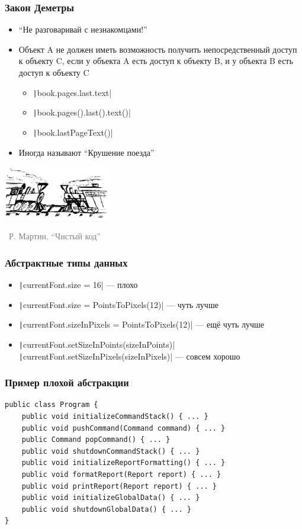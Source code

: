 \documentclass[xetex,mathserif,serif]{beamer}
\newcommand{\attribution}[1] {
	\begin{flushright}\begin{scriptsize}\textcolor{gray}{\textcopyright\, #1}\end{scriptsize}\end{flushright}
}
\begin{document}
	\begin{frame}
		\frametitle{Закон Деметры}
		\begin{itemize}
			\item ``Не разговаривай с незнакомцами!''
			\item Объект A не должен иметь возможность получить непосредственный доступ к объекту C, если у объекта A есть доступ к объекту B, и у объекта B есть доступ к объекту C
			\begin{itemize}
				\item \texttt|book.pages.last.text|
				\item \texttt|book.pages().last().text()|
				\item \texttt|book.lastPageText()|
			\end{itemize}
			\item Иногда называют ``Крушение поезда''
		\end{itemize}
		\begin{flushright}
			\includegraphics[width=0.35\textwidth]{trains.png}
		\end{flushright}
		\vspace{-0.8cm}
		\attribution{Р. Мартин, ``Чистый код''}
	\end{frame}

	\begin{frame}
		\frametitle{Абстрактные типы данных}
		\begin{itemize}
			\item \texttt|currentFont.size = 16| --- плохо
			\item \texttt|currentFont.size = PointsToPixels(12)| --- чуть лучше
			\item \texttt|currentFont.sizeInPixels = PointsToPixels(12)| --- ещё чуть лучше
			\item \texttt|currentFont.setSizeInPoints(sizeInPoints)| \newline
					\texttt|currentFont.setSizeInPixels(sizeInPixels)| --- совсем хорошо
		\end{itemize}
	\end{frame}

	\begin{frame}[fragile]
		\frametitle{Пример плохой абстракции}
		\begin{verbatim}
public class Program {
    public void initializeCommandStack() { ... }
    public void pushCommand(Command command) { ... }
    public Command popCommand() { ... }
    public void shutdownCommandStack() { ... }
    public void initializeReportFormatting() { ... }
    public void formatReport(Report report) { ... }
    public void printReport(Report report) { ... }
    public void initializeGlobalData() { ... }
    public void shutdownGlobalData() { ... }
}
		\end{verbatim}
\end{frame}
\end{document}
